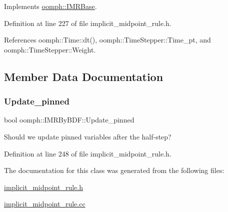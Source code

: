 Implements \hyperlink{classoomph_1_1IMRBase_a36b8a37b4c0bb9e8cca821bfb74fd373}{oomph\+::\+I\+M\+R\+Base}.



Definition at line 227 of file implicit\+\_\+midpoint\+\_\+rule.\+h.



References oomph\+::\+Time\+::dt(), oomph\+::\+Time\+Stepper\+::\+Time\+\_\+pt, and oomph\+::\+Time\+Stepper\+::\+Weight.



\subsection{Member Data Documentation}
\mbox{\label{classoomph_1_1IMRByBDF_a1c2bf7b4272f4c5b28c2e6e9811b2e14}} 
\subsubsection{\texorpdfstring{Update\+\_\+pinned}{Update\_pinned}}
{\footnotesize\ttfamily bool oomph\+::\+I\+M\+R\+By\+B\+D\+F\+::\+Update\+\_\+pinned}



Should we update pinned variables after the half-\/step? 



Definition at line 248 of file implicit\+\_\+midpoint\+\_\+rule.\+h.



The documentation for this class was generated from the following files\+:\begin{DoxyCompactItemize}
\item 
\hyperlink{implicit__midpoint__rule_8h}{implicit\+\_\+midpoint\+\_\+rule.\+h}\item 
\hyperlink{implicit__midpoint__rule_8cc}{implicit\+\_\+midpoint\+\_\+rule.\+cc}\end{DoxyCompactItemize}
